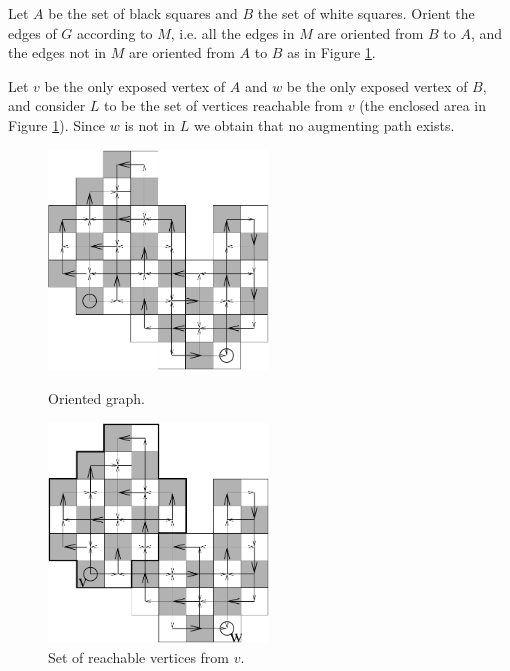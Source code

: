 \documentclass[12pt]{article}
\begin{document}
\begin{enumerate}
Let $A$ be the set of black squares and $B$ the set of white squares.
Orient the edges of $G$ according to $M$, i.e. all the edges in $M$
are oriented from $B$ to $A$, and the edges not in $M$ are oriented
from $A$ to $B$ as in Figure \ref{fig:domino34}.

Let $v$ be the only exposed vertex of $A$ and $w$ be the only exposed
vertex of $B$, and consider $L$ to be the set of vertices reachable
from $v$ (the enclosed area in Figure \ref{fig:domino34}). Since $w$
is not in $L$ we obtain that no augmenting path exists.
\begin{figure}[ht]
\begin{minipage}[b]{0.5\linewidth} %
\begin{center}
\includegraphics[height=2.3in]{../figures/domino3}
\end{center}
\caption{Oriented graph.}
\end{minipage}
\hspace{0.5cm} %
\begin{minipage}[b]{0.5\linewidth}
\begin{center}
\includegraphics[height=2.3in]{../figures/domino4}
\end{center}
\caption{Set of reachable vertices from $v$.\label{fig:domino34}}
\end{minipage}
\end{figure}


\end{enumerate}
\end{document}
